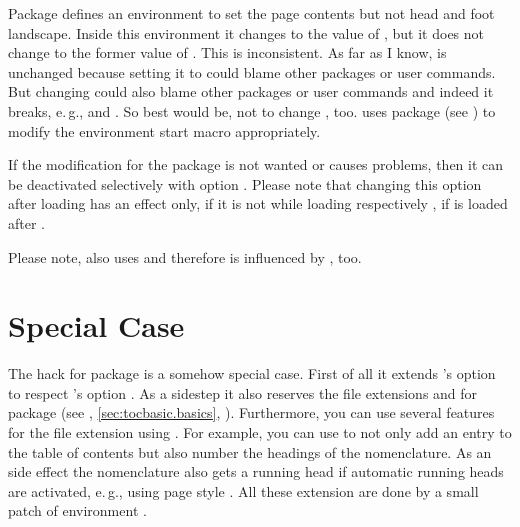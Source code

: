 Package
 defines an environment
 to set the page contents but not
head and foot landscape. Inside this environment it changes
 to the value of
, but it does not change  to the former
value of .  This is inconsistent. As far as I know,
 is unchanged because setting it to 
could blame other packages or user commands. But changing 
could also blame other packages or user commands and indeed it breaks, e.\,g.,
 and
. So best would be, not to change
, too.  uses package  (see
\cite{package:xpatch}) to modify the environment start macro 
appropriately.

If the modification for the package is not wanted or causes problems,
then it can be deactivated selectively with option
.
Please note that changing this option after loading
 has an effect only, if it is not  while
loading  respectively , if
 is loaded after .

Please note,
 also uses
 and therefore is influenced by , too.%


\section{Special Case }
\label{sec:nomencl}

The hack for package
 is a somehow special
case. First of all it extends 's option  to
respect \KOMAScript's option
. As a sidestep it also
reserves the file extensions  and  for package
 (see ,
\autoref{sec:tocbasic.basics},
). Furthermore, you can use several
features for the file extension  using
. For example, you can use
 to not
only add an entry to the table of contents but also number the headings of the
nomenclature. As an side effect the nomenclature also gets a running head if
automatic running heads are activated, e.\,g., using page style
. All these extension are done by a small
patch of environment .
%
\EndIndexGroup

\endinput

